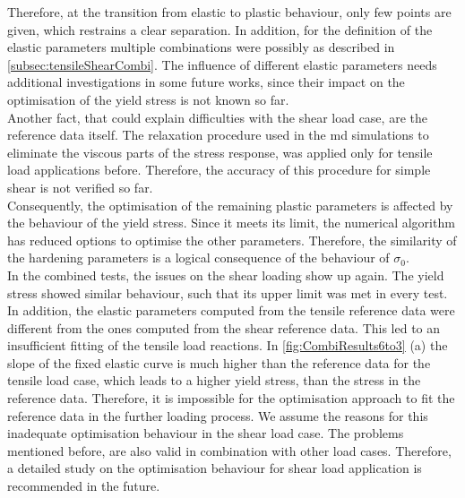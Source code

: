 Therefore, at the transition from elastic to plastic behaviour, only few points are given, which restrains a clear separation. In addition, for the definition of the elastic parameters multiple combinations were possibly as described in \autoref{subsec:tensileShearCombi}. The influence of different elastic parameters needs additional investigations in some future works, since their impact on the optimisation of the yield stress is not known so far. \\
\indent Another fact, that could explain difficulties with the shear load case, are the reference data itself. The relaxation procedure used in the \acrshort{md} simulations to eliminate the viscous parts of the stress response, was applied only for tensile load applications before. Therefore, the accuracy of this procedure for simple shear is not verified so far. \\
\indent Consequently, the optimisation of the remaining plastic parameters is affected by the behaviour of the yield stress. Since it meets its limit, the numerical algorithm has reduced options to optimise the other parameters. Therefore, the similarity of the hardening parameters is a logical consequence of the behaviour of $\sigma_0$. \\
\indent In the combined tests, the issues on the shear loading show up again. The yield stress showed similar behaviour, such that its upper limit was met in every test.
In addition, the elastic parameters computed from the tensile reference data were different from the ones computed from the shear reference data.
This led to an insufficient fitting of the tensile load reactions. In \autoref{fig:CombiResults6to3} (a) the slope of the fixed elastic curve is much higher than the reference data for the tensile load case, which leads to a higher yield stress, than the stress in the reference data. Therefore, it is impossible for the optimisation approach to fit the reference data in the further loading process. We assume the reasons for this inadequate optimisation behaviour in the shear load case. The problems mentioned before, are also valid in combination with other load cases. Therefore, a detailed study on the optimisation behaviour for shear load application is recommended in the future.

 



